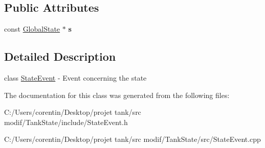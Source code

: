 \subsection*{Public Attributes}
\begin{DoxyCompactItemize}
\item 
\mbox{\label{classstate_1_1_state_event_abf29a1b9a3e094a064969faf9107e6c8}} 
const \hyperlink{classstate_1_1_global_state}{Global\+State} $\ast$ {\bfseries s}
\end{DoxyCompactItemize}


\subsection{Detailed Description}
class \hyperlink{classstate_1_1_state_event}{State\+Event} -\/ Event concerning the state 

The documentation for this class was generated from the following files\+:\begin{DoxyCompactItemize}
\item 
C\+:/\+Users/corentin/\+Desktop/projet tank/src modif/\+Tank\+State/include/State\+Event.\+h\item 
C\+:/\+Users/corentin/\+Desktop/projet tank/src modif/\+Tank\+State/src/State\+Event.\+cpp\end{DoxyCompactItemize}
